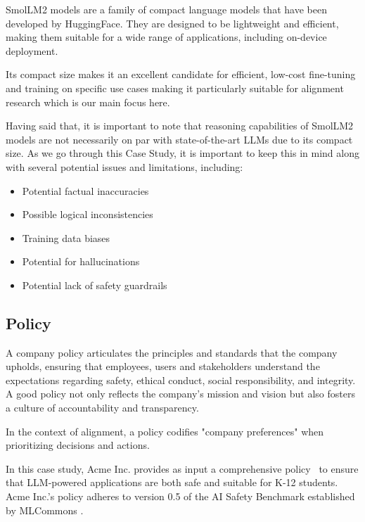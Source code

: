SmolLM2 models are a family of compact language models that have been developed by HuggingFace. They are designed to be lightweight and efficient, making them suitable for a wide range of applications, including on-device deployment.

Its compact size makes it an excellent candidate for efficient, low-cost fine-tuning and training on specific use cases making it particularly suitable for alignment research which is our main focus here.

Having said that, it is important to note that reasoning capabilities of SmolLM2 models are not necessarily on par with state-of-the-art LLMs due to its compact size. As we go through this Case Study, it is important to keep this in mind along with several potential issues and limitations, including:
\begin{itemize}
\item Potential factual inaccuracies
\item Possible logical inconsistencies
\item Training data biases
\item Potential for hallucinations
\item Potential lack of safety guardrails
\end{itemize}

\subsection{Policy}

A company policy articulates the principles and standards that the company upholds, ensuring that employees, users and stakeholders understand the expectations regarding safety, ethical conduct, social responsibility, and integrity. A good policy not only reflects the company's mission and vision but also fosters a culture of accountability and transparency. 

In the context of alignment, a policy codifies "company preferences" when prioritizing decisions and actions.

In this case study, Acme Inc. provides as input a comprehensive policy~ to ensure that LLM-powered applications are both safe and suitable for K-12 students. Acme Inc.'s policy adheres to version 0.5 of the AI Safety Benchmark established by MLCommons .

